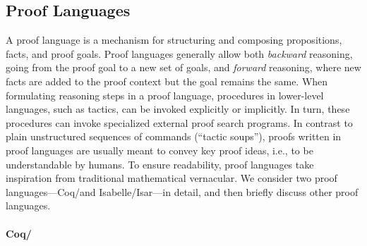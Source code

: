 %

\subsection{Proof Languages}
\label{sec:structuredprooflangs}

A proof language is a mechanism for structuring and composing
propositions, facts, and proof goals. Proof languages generally allow both
\emph{backward} reasoning, going from the proof goal to a new set of goals,
and \emph{forward} reasoning, where new facts are added to the proof context
but the goal remains the same. When formulating reasoning steps in a proof language,
procedures in lower-level languages, such as tactics, can be invoked explicitly
or implicitly. In turn, these procedures can invoke specialized external proof search
programs. In contrast to plain unstructured sequences of commands (``tactic soups''), proofs written in
proof languages are usually meant to convey key proof ideas, i.e., to be understandable by humans.
To ensure readability, proof languages take inspiration from
traditional mathematical vernacular. We consider two proof languages---Coq/\ssreflect and Isabelle/Isar---in detail, and then briefly discuss other proof languages.

\paragraph{Coq/\ssreflect}


